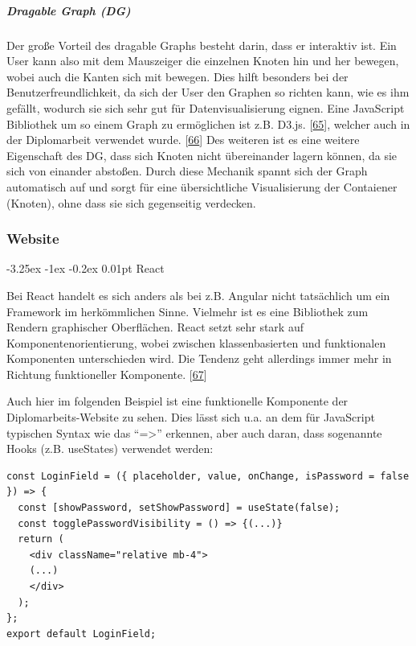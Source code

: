 \documentclass[
    headings=optiontotocandhead,%
    twoside,
    numbers=noenddot,%
    12pt, %
    titlepage, %
    parskip=full, %
    listof=leveldown, 
    numbers=noenddot, %
    a4paper,DIV=14,
    BCOR=15mm,
]{scrbook}
\makeatletter
\renewcommand\paragraph{\@startsection{paragraph}{4}{\z@}%
    {-3.25ex \@plus -1ex \@minus -0.2ex}%
    {0.01pt}%
    {\raggedsection\normalfont\sectfont\nobreak\size@paragraph}%
  }
\makeatother
\begin{document}
\hypertarget{dragable-graph-dg}{%
\subparagraph{Dragable Graph (DG)}\label{dragable-graph-dg}}

Der große Vorteil des dragable Graphs besteht darin, dass er interaktiv
ist. Ein User kann also mit dem Mauszeiger die einzelnen Knoten hin und
her bewegen, wobei auch die Kanten sich mit bewegen. Dies hilft
besonders bei der Benutzerfreundlichkeit, da sich der User den Graphen
so richten kann, wie es ihm gefällt, wodurch sie sich sehr gut für
Datenvisualisierung eignen. Eine JavaScript Bibliothek um so einem Graph
zu ermöglichen ist z.B. D3.js.
{[}\protect\hyperlink{ref-D3js-Homepage}{65}{]}, welcher auch in der
Diplomarbeit verwendet wurde.
{[}\protect\hyperlink{ref-gpt-DragableGraph}{66}{]} Des weiteren ist es
eine weitere Eigenschaft des DG, dass sich Knoten nicht übereinander
lagern können, da sie sich von einander abstoßen. Durch diese Mechanik
spannt sich der Graph automatisch auf und sorgt für eine übersichtliche
Visualisierung der Contaiener (Knoten), ohne dass sie sich gegenseitig
verdecken.

\hypertarget{website}{%
\subsubsection{Website}\label{website}}

\hypertarget{react}{%
\paragraph{React}\label{react}}

Bei React handelt es sich anders als bei z.B. Angular nicht tatsächlich
um ein Framework im herkömmlichen Sinne. Vielmehr ist es eine Bibliothek
zum Rendern graphischer Oberflächen. React setzt sehr stark auf
Komponentenorientierung, wobei zwischen klassenbasierten und
funktionalen Komponenten unterschieden wird. Die Tendenz geht allerdings
immer mehr in Richtung funktioneller Komponente.
{[}\protect\hyperlink{ref-Heise-React}{67}{]}

Auch hier im folgenden Beispiel ist eine funktionelle Komponente der
Diplomarbeits-Website zu sehen. Dies lässt sich u.a. an dem für
JavaScript typischen Syntax wie das ``=\textgreater{}'' erkennen, aber
auch daran, dass sogenannte Hooks (z.B. useStates) verwendet werden:

\begin{lstlisting}[caption={Beispiel funktionelle Komponente LoginField}]
const LoginField = ({ placeholder, value, onChange, isPassword = false }) => {
  const [showPassword, setShowPassword] = useState(false);
  const togglePasswordVisibility = () => {(...)}
  return (
    <div className="relative mb-4"> 
    (...)
    </div>
  );
};
export default LoginField;
\end{lstlisting}
\end{document}
